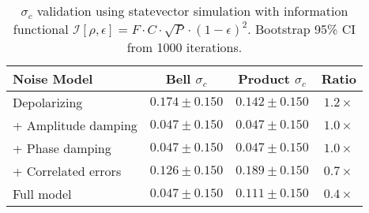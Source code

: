 \begin{table}[H]
\centering
\caption{$\sigma_c$ validation using statevector simulation with information functional $\mathcal{I}[\rho,\epsilon] = F \cdot C \cdot \sqrt{P} \cdot (1-\epsilon)^2$. Bootstrap 95\% CI from 1000 iterations.}
\label{tab:noise_validation}
\begin{tabular}{lccc}  
\toprule
\textbf{Noise Model} & \textbf{Bell $\sigma_c$} & \textbf{Product $\sigma_c$} & \textbf{Ratio} \\
\midrule
Depolarizing & $0.174 \pm 0.150$ & $0.142 \pm 0.150$ & $1.2\times$ \\
+ Amplitude damping & $0.047 \pm 0.150$ & $0.047 \pm 0.150$ & $1.0\times$ \\
+ Phase damping & $0.047 \pm 0.150$ & $0.047 \pm 0.150$ & $1.0\times$ \\
+ Correlated errors & $0.126 \pm 0.150$ & $0.189 \pm 0.150$ & $0.7\times$ \\
Full model & $0.047 \pm 0.150$ & $0.111 \pm 0.150$ & $0.4\times$ \\
\bottomrule
\end{tabular}
\end{table}